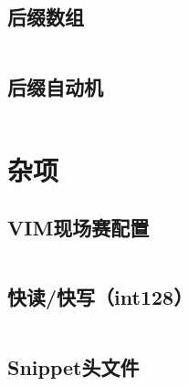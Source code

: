 \documentclass[a4paper,10pt]{article}
\begin{document}
\subsection{后缀数组}
\inputminted[breaklines, linenos]{c++}{string/sa.cc}
\subsection{后缀自动机}
\inputminted[breaklines, linenos]{c++}{string/sam.cc}

\newpage
\section{杂项}
\subsection{VIM现场赛配置}
\inputminted[breaklines, linenos]{bash}{others/vim.bash}
\subsection{快读/快写（int128）}
\inputminted[breaklines, linenos]{c++}{others/fast_read.cc}
\subsection{Snippet头文件}
\inputminted[breaklines, linenos]{c++}{others/head.cc}
\end{document}
